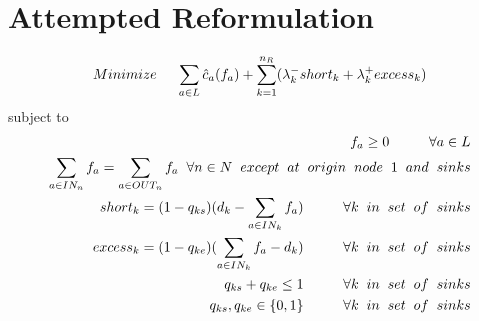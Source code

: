 \documentclass{article}
\begin{document}
\section{Attempted Reformulation}
\break
$$Minimize \hspace{5mm} \sum_{a \in L}\hat{c}_a(f_a) + \sum_{k=1}^{n_R}(\lambda_k^-short_k + \lambda_k^+excess_k) $$
subject to
\begin{align}
    f_a \geq 0 \hspace{10mm} \forall a \in L\\
    \sum_{a \in IN_n}f_a = \sum_{a \in OUT_n} f_a \hspace{2mm} \forall n \in N \hspace{2mm} except \hspace{2mm} at \hspace{2mm} origin \hspace{2mm} node \hspace{2mm} 1 \hspace{2mm} and \hspace{2mm} sinks\\
    short_k = (1 - q_{ks})(d_k - \sum_{a \in IN_k}f_a) \hspace{10mm} \forall k \hspace{2mm} in \hspace{2mm} set \hspace{2mm} of \hspace{2mm} sinks\\
    excess_k = (1 - q_{ke})(\sum_{a \in IN_k}f_a - d_k) \hspace{10mm} \forall k \hspace{2mm} in \hspace{2mm} set \hspace{2mm} of \hspace{2mm} sinks\\
    q_{ks} + q_{ke} \leq 1 \hspace{10mm} \forall k \hspace{2mm} in \hspace{2mm} set \hspace{2mm} of \hspace{2mm} sinks\\
    q_{ks}, q_{ke} \in \{0,1\} \hspace{10mm} \forall k \hspace{2mm} in \hspace{2mm} set \hspace{2mm} of \hspace{2mm} sinks
\end{align}
\end{document}
